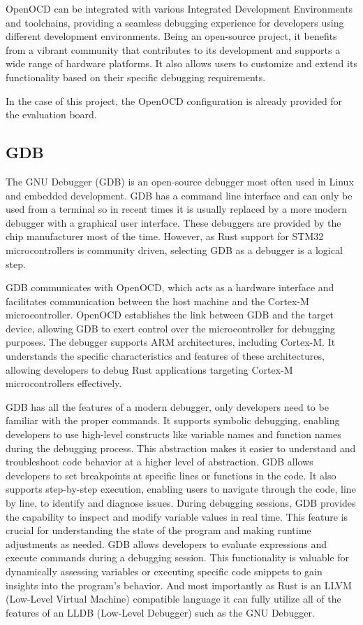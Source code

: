 OpenOCD can be integrated with various Integrated Development Environments and toolchains, providing a seamless debugging experience for developers using different development environments. Being an open-source project, it benefits from a vibrant community that contributes to its development and supports a wide range of hardware platforms. It also allows users to customize and extend its functionality based on their specific debugging requirements.

In the case of this project, the OpenOCD configuration is already provided for the evaluation board. \cite{OpenocdConfigFile}

\subsection{GDB}

The GNU Debugger (GDB) is an open-source debugger most often used in Linux and embedded development. GDB has a command line interface and can only be used from a terminal so in recent times it is usually replaced by a more modern debugger with a graphical user interface. These debuggers are provided by the chip manufacturer most of the time. However, as Rust support for STM32 microcontrollers is community driven, selecting GDB as a debugger is a logical step.

GDB communicates with OpenOCD, which acts as a hardware interface and facilitates communication between the host machine and the Cortex-M microcontroller. OpenOCD establishes the link between GDB and the target device, allowing GDB to exert control over the microcontroller for debugging purposes. The debugger supports ARM architectures, including Cortex-M. It understands the specific characteristics and features of these architectures, allowing developers to debug Rust applications targeting Cortex-M microcontrollers effectively.

GDB has all the features of a modern debugger, only developers need to be familiar with the proper commands. It supports symbolic debugging, enabling developers to use high-level constructs like variable names and function names during the debugging process. This abstraction makes it easier to understand and troubleshoot code behavior at a higher level of abstraction. GDB allows developers to set breakpoints at specific lines or functions in the code. It also supports step-by-step execution, enabling users to navigate through the code, line by line, to identify and diagnose issues. During debugging sessions, GDB provides the capability to inspect and modify variable values in real time. This feature is crucial for understanding the state of the program and making runtime adjustments as needed. GDB allows developers to evaluate expressions and execute commands during a debugging session. This functionality is valuable for dynamically assessing variables or executing specific code snippets to gain insights into the program's behavior. And most importantly as Rust is an LLVM (Low-Level Virtual Machine) compatible language it can fully utilize all of the features of an LLDB (Low-Level Debugger) such as the GNU Debugger.

